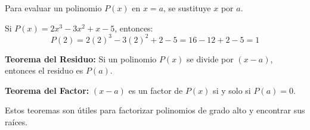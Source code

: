 
\begin{definition}
Para evaluar un polinomio $P(x)$ en $x = a$, se sustituye $x$ por $a$.
\end{definition}

\begin{example}
Si $P(x) = 2x^3 - 3x^2 + x - 5$, entonces:
$$P(2) = 2(2)^3 - 3(2)^2 + 2 - 5 = 16 - 12 + 2 - 5 = 1$$
\end{example}

\begin{theorem}
\textbf{Teorema del Residuo:} Si un polinomio $P(x)$ se divide por $(x - a)$, entonces el residuo es $P(a)$.

\textbf{Teorema del Factor:} $(x - a)$ es un factor de $P(x)$ si y solo si $P(a) = 0$.
\end{theorem}

Estos teoremas son útiles para factorizar polinomios de grado alto y encontrar sus raíces.